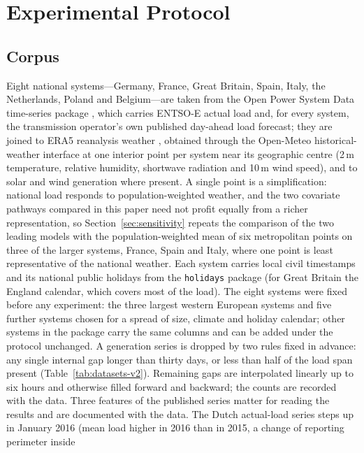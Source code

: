 \section{Experimental Protocol}
\label{sec:setup}

\subsection{Corpus}
Eight national systems---Germany, France, Great Britain, Spain, Italy, the Netherlands,
Poland and Belgium---are taken from the Open Power System Data time-series package
\cite{opsd2020}, which carries ENTSO-E actual load and, for every system, the transmission
operator's own published day-ahead load forecast; they are joined to ERA5 reanalysis weather
\cite{hersbach2020era5}, obtained through the Open-Meteo historical-weather interface
\cite{openmeteo} at one interior point per system near its geographic centre (2\,m
temperature, relative humidity, shortwave radiation and 10\,m wind speed), and to solar and
wind generation where present. A single point is a simplification: national load responds to
population-weighted weather, and the two covariate pathways compared in this paper need not
profit equally from a richer representation, so Section~\ref{sec:sensitivity} repeats the
comparison of the two leading models with the population-weighted mean of six metropolitan
points on three of the larger systems, France, Spain and Italy, where one point is least
representative of the national weather. Each system carries local civil timestamps and its national
public holidays from the \texttt{holidays} package (for Great Britain the England calendar,
which covers most of the load). The eight systems were fixed before any experiment: the three
largest western European systems and five further systems chosen for a spread of size,
climate and holiday calendar; other systems in the package carry the same columns and can be
added under the protocol unchanged. A generation series is dropped by two rules fixed in
advance: any single internal gap longer than thirty days, or less than half of the load span
present (Table~\ref{tab:datasets-v2}). Remaining gaps are interpolated linearly up to six
hours and otherwise filled forward and backward; the counts are recorded with the data.
Three features of the published series matter for reading the results and are documented with
the data. The Dutch actual-load series steps up in January 2016 (mean load
 higher in 2016 than in 2015, a change of reporting perimeter inside
